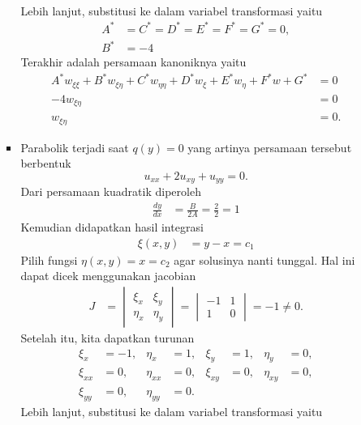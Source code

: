 \documentclass[a4paper]{article}
\theoremstyle{definition}
\begin{document}
\begin{enumerate}
\begin{enumerate}
\begin{itemize}
\begin{align*}
      \end{align*}
      Lebih lanjut, substitusi ke dalam variabel transformasi yaitu
      \begin{align*}
        A^* &= C^* = D^* = E^* = F^* = G^* = 0, \\
        B^* &= -4
      \end{align*}
      Terakhir adalah persamaan kanoniknya yaitu
      \begin{align*}
        A^* w_{\xi\xi} + B^* w_{\xi\eta} + C^* w_{\eta\eta} + D^* w_{\xi} + E^* w_{\eta} + F^* w + G^* &= 0 \\
        -4 w_{\xi\eta} &= 0 \\
        w_{\xi\eta} &= 0.
      \end{align*}
      \item Parabolik terjadi saat $q(y) = 0$ yang artinya persamaan tersebut berbentuk
      \[
      u_{xx} + 2u_{xy} + u_{yy} = 0.
      \]
      Dari persamaan kuadratik diperoleh
      \begin{align*}
        \frac{dy}{dx} &= \frac{B}{2A} = \frac{2}{2} = 1
      \end{align*}
      Kemudian didapatkan hasil integrasi
      \begin{align*}
        \xi(x,y) &= y-x = c_1
      \end{align*}
      Pilih fungsi $\eta(x,y)=x=c_2$ agar solusinya nanti tunggal. Hal ini dapat dicek menggunakan jacobian
      \begin{align*}
        J &= \begin{vmatrix}
          \xi_x & \xi_y \\
          \eta_x & \eta_y
        \end{vmatrix} = 
        \begin{vmatrix}
          -1 & 1 \\
          1 & 0
        \end{vmatrix} = -1\ne 0.
      \end{align*}
      Setelah itu, kita dapatkan turunan
      \begin{align*}
        \xi_x &= -1, & \eta_x &= 1, &
        \xi_y &= 1, & \eta_y &= 0, \\
        \xi_{xx} &= 0, & \eta_{xx} &= 0, &
        \xi_{xy} &= 0, & \eta_{xy} &= 0, \\
        \xi_{yy} &= 0, & \eta_{yy} &= 0.
      \end{align*}
      Lebih lanjut, substitusi ke dalam variabel transformasi yaitu
      \begin{align*}

\end{align*}
\end{itemize}
\end{enumerate}
\end{enumerate}
\end{document}
